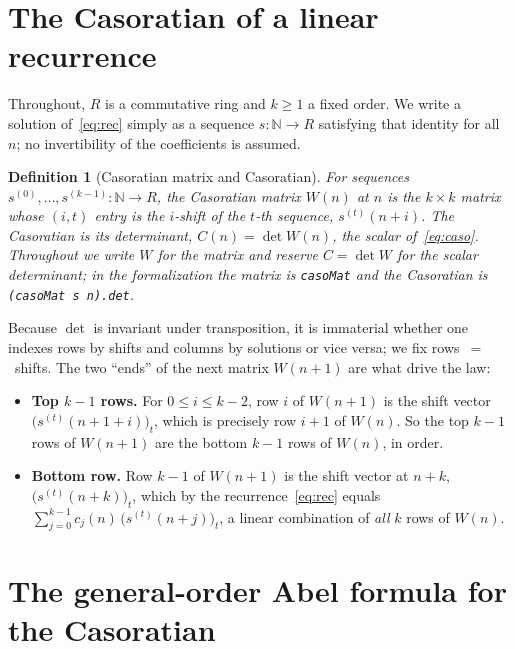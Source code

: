 \documentclass[11pt]{article}
\newtheorem{definition}[theorem]{Definition}
\newcommand{\N}{\mathbb{N}}
\newcommand{\Caso}{C}
\newcommand{\CasoM}{W}
\begin{document}
\section{The Casoratian of a linear recurrence}\label{sec:setup}

Throughout, $R$ is a commutative ring and $k\ge1$ a fixed order. We write a solution
of~\eqref{eq:rec} simply as a sequence $s\colon\N\to R$ satisfying that identity for
all $n$; no invertibility of the coefficients is assumed.

\begin{definition}[Casoratian matrix and Casoratian]\label{def:caso}
For sequences $s^{(0)},\dots,s^{(k-1)}\colon\N\to R$, the \emph{Casoratian matrix}
$\CasoM(n)$ at $n$ is the $k\times k$ matrix whose $(i,t)$ entry is the $i$-shift of the
$t$-th sequence, $s^{(t)}(n+i)$. The \emph{Casoratian} is its determinant,
$\Caso(n)=\det\CasoM(n)$, the scalar of~\eqref{eq:caso}. Throughout we write $\CasoM$
for the matrix and reserve $\Caso=\det\CasoM$ for the scalar determinant; in the
formalization the matrix is \texttt{casoMat} and the Casoratian is
\texttt{(casoMat\,s\,n).det}.
\end{definition}

Because $\det$ is invariant under transposition, it is immaterial whether one indexes
rows by shifts and columns by solutions or vice versa; we fix rows~$=$~shifts. The
two ``ends'' of the next matrix $\CasoM(n+1)$ are what drive the law:
\begin{itemize}
\item \textbf{Top $k-1$ rows.} For $0\le i\le k-2$, row $i$ of $\CasoM(n+1)$ is the
shift vector $\big(s^{(t)}(n+1+i)\big)_t$, which is precisely row $i+1$ of
$\CasoM(n)$. So the top $k-1$ rows of $\CasoM(n+1)$ are the bottom $k-1$ rows of
$\CasoM(n)$, in order.
\item \textbf{Bottom row.} Row $k-1$ of $\CasoM(n+1)$ is the shift vector at
$n+k$, $\big(s^{(t)}(n+k)\big)_t$, which by the recurrence~\eqref{eq:rec} equals
$\sum_{j=0}^{k-1}c_j(n)\,\big(s^{(t)}(n+j)\big)_t$, a linear combination of \emph{all}
$k$ rows of $\CasoM(n)$.
\end{itemize}

\section{The general-order Abel formula for the Casoratian}\label{sec:law}
\end{document}

